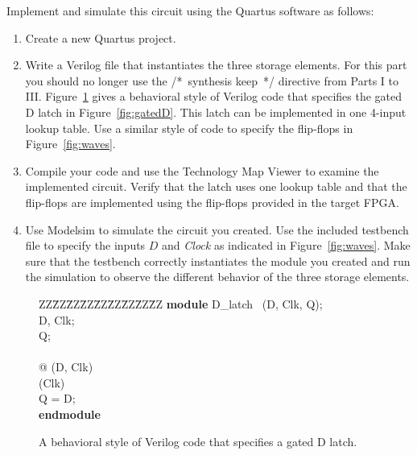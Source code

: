 \documentclass[epsfig,10pt,fullpage]{article}
\begin{document}
Implement and simulate this circuit using the Quartus software as follows:
\begin{enumerate}
\item Create a new Quartus project. 
\item Write a Verilog file that instantiates the three storage elements. For this part you
should no longer use the /*~synthesis keep~*/ directive from Parts I to III. 
Figure~\ref{fig:behave} gives a behavioral style of Verilog code that specifies the gated D 
latch in Figure~\ref{fig:gatedD}.
This latch can be implemented in one 4-input lookup table. Use a similar style of
code to specify the flip-flops in Figure~\ref{fig:waves}.
\item Compile your code and use the Technology Map Viewer to examine the implemented circuit.
Verify that the latch uses one lookup table and that the flip-flops are implemented using
the flip-flops provided in the target FPGA.
\item Use Modelsim to simulate the circuit you created. Use the included testbench file to 
specify the inputs $D$ and {\it Clock} as indicated in Figure~\ref{fig:waves}.
Make sure that the testbench correctly instantiates the module you created and 
run the simulation to observe the different behavior of the three storage elements.
\end{enumerate}

\begin{figure}[H]
\begin{center}
\begin{minipage}[t]{12.5 cm}
\begin{tabbing}
ZZ\=ZZ\=ZZ\=ZZ\=ZZ\=ZZ\=ZZ\=ZZ\=ZZ\kill
{\bf module} D\_latch ~(D, Clk, Q);\\
 D, Clk;\\
 Q;\\
~\\
 @ (D, Clk)\\
\> (Clk)\\
\>\>\>Q = D;\\
{\bf endmodule}\\
\end{tabbing}
\end{minipage}
\end{center}
\caption{A behavioral style of Verilog code that specifies a gated D latch.}
\label{fig:behave}
\end{figure}
\end{document}
